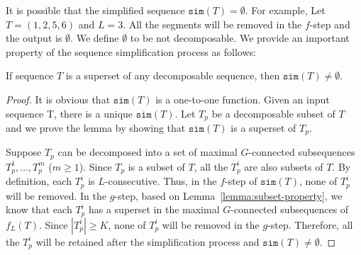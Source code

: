 It is possible that the simplified sequence $\mathtt{sim}(T)=\emptyset$. For example, Let $T=(1,2,5,6)$ 
and $L=3$. All the segments will be removed in the $f$-step and the output is $\emptyset$.
We define $\emptyset$ to be not decomposable. 
We provide an important property of the sequence simplification process as follows:
\begin{lemma}\label{lemma:decom-sim}
If sequence $T$ is a superset of any decomposable sequence, then $\mathtt{sim}(T) \neq \emptyset$.
\end{lemma}
\begin{proof}
It is obvious that $\mathtt{sim}(T)$ is a one-to-one function. Given an input sequence T, there is a unique  $\mathtt{sim}(T)$. Let $T_p$ be a decomposable subset of $T$ and we prove the lemma by showing that $\mathtt{sim}(T)$ is a superset of $T_p$.

Suppose $T_p$ can be decomposed into a set of maximal $G$-connected
subsequences $T_p^1, \ldots, T_p^m$ ($m \geq 1$). Since $T_p$ is a subset of $T$, all the $T_p^i$ are also subsets of $T$. By definition, each $T_p^i$ is $L$-consecutive. Thus, in the $f$-step of $\mathtt{sim}(T)$, none of $T_p^i$ will be removed. In the $g$-step, based on Lemma~\ref{lemma:subset-property}, we know that each $T_p^i$ has a superset in the maximal $G$-connected subsequences of $f_L(T)$. Since $|T_p^i|\geq K$, none of $T_p^i$ will be removed in the $g$-step. Therefore, all the $T_p^i$ will be retained after the simplification process and $\mathtt{sim}(T) \neq \emptyset$.
\end{proof}



